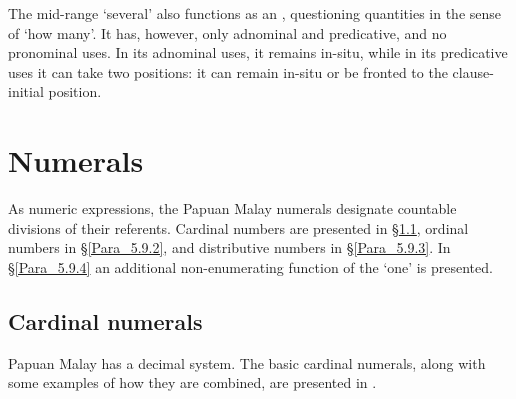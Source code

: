 The mid-range   ‘several’ also functions as an , questioning quantities in the sense of ‘how many’. It has, however, only adnominal and predicative, and no pronominal uses. In its adnominal uses, it remains in-situ, while in its predicative uses it can take two positions: it can remain in-situ or be fronted to the clause-initial position.


\section{Numerals}
\label{Para_5.9}
As numeric expressions, the Papuan Malay numerals designate countable divisions of their referents. Cardinal numbers are presented in §\ref{Para_5.9.1}, ordinal numbers in §\ref{Para_5.9.2}, and distributive numbers in §\ref{Para_5.9.3}. In §\ref{Para_5.9.4} an additional non-enumerating function of the   ‘one’ is presented.


\subsection{Cardinal numerals}
\label{Para_5.9.1}
Papuan Malay has a decimal  system. The basic cardinal numerals, along with some examples of how they are combined, are presented in .


